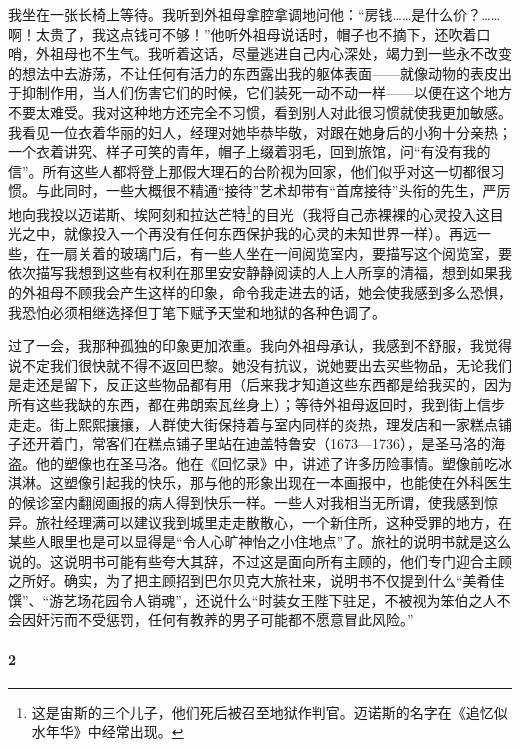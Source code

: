 \par 我坐在一张长椅上等待。我听到外祖母拿腔拿调地问他：“房钱……是什么价？……啊！太贵了，我这点钱可不够！”他听外祖母说话时，帽子也不摘下，还吹着口哨，外祖母也不生气。我听着这话，尽量逃进自己内心深处，竭力到一些永不改变的想法中去游荡，不让任何有活力的东西露出我的躯体表面——就像动物的表皮出于抑制作用，当人们伤害它们的时候，它们装死一动不动一样——以便在这个地方不要太难受。我对这种地方还完全不习惯，看到别人对此很习惯就使我更加敏感。我看见一位衣着华丽的妇人，经理对她毕恭毕敬，对跟在她身后的小狗十分亲热；一个衣着讲究、样子可笑的青年，帽子上缀着羽毛，回到旅馆，问“有没有我的信”。所有这些人都将登上那假大理石的台阶视为回家，他们似乎对这一切都很习惯。与此同时，一些大概很不精通“接待”艺术却带有“首席接待”头衔的先生，严厉地向我投以迈诺斯、埃阿刻和拉达芒特\footnote{这是宙斯的三个儿子，他们死后被召至地狱作判官。迈诺斯的名字在《追忆似水年华》中经常出现。}的目光（我将自己赤裸裸的心灵投入这目光之中，就像投入一个再没有任何东西保护我的心灵的未知世界一样）。再远一些，在一扇关着的玻璃门后，有一些人坐在一间阅览室内，要描写这个阅览室，要依次描写我想到这些有权利在那里安安静静阅读的人上人所享的清福，想到如果我的外祖母不顾我会产生这样的印象，命令我走进去的话，她会使我感到多么恐惧，我恐怕必须相继选择但丁笔下赋予天堂和地狱的各种色调了。
\par 过了一会，我那种孤独的印象更加浓重。我向外祖母承认，我感到不舒服，我觉得说不定我们很快就不得不返回巴黎。她没有抗议，说她要出去买些物品，无论我们是走还是留下，反正这些物品都有用（后来我才知道这些东西都是给我买的，因为所有这些我缺的东西，都在弗朗索瓦丝身上）；等待外祖母返回时，我到街上信步走走。街上熙熙攘攘，人群使大街保持着与室内同样的炎热，理发店和一家糕点铺子还开着门，常客们在糕点铺子里站在迪盖特鲁安（1673—1736），是圣马洛的海盗。他的塑像也在圣马洛。他在《回忆录》中，讲述了许多历险事情。塑像前吃冰淇淋。这塑像引起我的快乐，那与他的形象出现在一本画报中，也能使在外科医生的候诊室内翻阅画报的病人得到快乐一样。一些人对我相当无所谓，使我感到惊异。旅社经理满可以建议我到城里走走散散心，一个新住所，这种受罪的地方，在某些人眼里也是可以显得是“令人心旷神怡之小住地点”了。旅社的说明书就是这么说的。这说明书可能有些夸大其辞，不过这是面向所有主顾的，他们专门迎合主顾之所好。确实，为了把主顾招到巴尔贝克大旅社来，说明书不仅提到什么“美肴佳馔”、“游艺场花园令人销魂”，还说什么“时装女王陛下驻足，不被视为笨伯之人不会因奸污而不受惩罚，任何有教养的男子可能都不愿意冒此风险。”



\paragraph*{2}

